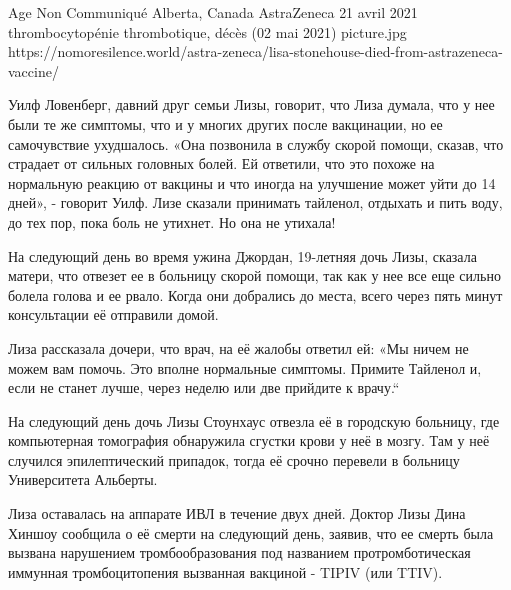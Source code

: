           {Age Non Communiqué}
          {Alberta, Canada}
          {AstraZeneca}
          {21 avril 2021}
          {thrombocytopénie thrombotique,
            décès (02 mai 2021)}
          {picture.jpg}
          {https://nomoresilence.world/astra-zeneca/lisa-stonehouse-died-from-astrazeneca-vaccine/}
          {

Уилф Ловенберг, давний друг семьи Лизы, говорит, что Лиза думала, что у нее были
те же симптомы, что и у многих других после вакцинации, но ее самочувствие
ухудшалось. «Она позвонила в службу скорой помощи, сказав, что страдает от
сильных головных болей. Ей ответили, что это похоже на нормальную реакцию от
вакцины и что иногда на улучшение может уйти до 14 дней», - говорит Уилф. Лизе
сказали принимать тайленол, отдыхать и пить воду, до тех пор, пока боль не
утихнет. Но она не утихала!

На следующий день во время ужина Джордан, 19-летняя дочь Лизы, сказала матери,
что отвезет ее в больницу скорой помощи, так как у нее все еще сильно болела
голова и ее рвало. Когда они добрались до места, всего через пять минут
консультации её отправили домой.

Лиза рассказала дочери, что врач, на её жалобы ответил ей: «Мы ничем не можем
вам помочь. Это вполне нормальные симптомы. Примите Тайленол и, если не станет
лучше, через неделю или две прийдите к врачу.“

На следующий день дочь Лизы Стоунхаус отвезла её в городскую больницу, где
компьютерная томография обнаружила сгустки крови у неё в мозгу. Там у неё
случился эпилептический припадок, тогда её срочно перевели в больницу
Университета Альберты.

Лиза оставалась на аппарате ИВЛ в течение двух дней. Доктор Лизы Дина Хиншоу
сообщила о её смерти на следующий день, заявив, что ее смерть была вызвана
нарушением тромбообразования под названием протромботическая иммунная
тромбоцитопения вызванная вакциной - TIPIV (или TTIV).

}

